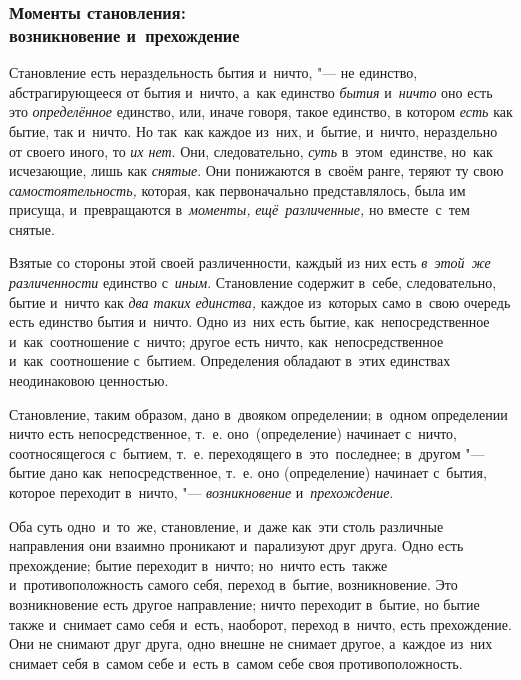 \subsubsection[Моменты становления: возникновение и~прехождение]%
{Моменты становления:\nopagebreak\\возникновение и~прехождение}

Становление есть нераздельность бытия и~ничто, "--- не единство,
абстрагирующееся от бытия и~ничто, а~как единство {\em бытия} и~{\em ничто} оно
есть это {\em определённое} единство, или, иначе говоря, такое единство, в
котором {\em есть} как бытие, так и~ничто. Но так~как каждое из~них, и~бытие,
и~ничто, нераздельно от своего иного, то {\em их нет}. Они, следовательно,
{\em суть} в~этом~единстве, но~как исчезающие, лишь как {\em снятые}. Они
понижаются в~своём ранге, теряют ту свою {\em самостоятельность,} которая, как
первоначально представлялось, была им присуща, и~превращаются в~{\em моменты,}
{\em ещё~различенные,} но вместе~с~тем снятые.

Взятые со стороны этой своей различенности, каждый из них есть
{\em в~этой~же различенности} единство с~{\em иным}. Становление содержит
в~себе, следовательно, бытие и~ничто как {\em два таких единства,} каждое из~которых
само в~свою очередь есть единство бытия и~ничто. Одно из~них есть бытие,
как~непосредственное и~как~соотношение с~ничто; другое есть ничто,
как~непосредственное и~как~соотношение с~бытием. Определения обладают в~этих
единствах неодинаковою ценностью.

Становление, таким образом, дано в~двояком определении; в~одном определении
ничто есть непосредственное, т.~е. оно~(определение) начинает с~ничто,
соотносящегося с~бытием, т.~е. переходящего в~это~последнее; в~другом "---
бытие дано как~непосредственное, т.~е. оно (определение) начинает с~бытия,
которое переходит в~ничто, "--- {\em возникновение} и~{\em прехождение}.

Оба суть одно~и~то~же, становление, и~даже как~эти столь различные направления
они взаимно проникают и~парализуют друг друга. Одно есть прехождение; бытие
переходит в~ничто; но~ничто есть~также и~противоположность самого себя, переход
в~бытие, возникновение. Это возникновение есть другое направление; ничто
переходит в~бытие, но бытие также и~снимает само себя и~есть, наоборот, переход
в~ничто, есть прехождение. Они не снимают друг друга, одно внешне не снимает
другое, а~каждое из~них снимает себя в~самом себе и~есть в~самом себе своя
противоположность.

